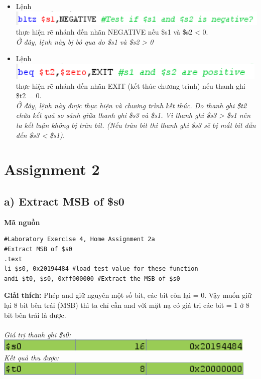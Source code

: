 \documentclass[12pt,a4paper,oneside]{article}
\begin{document}
\begin{itemize}
\begin{center}
\end{center}
\item Lệnh \includegraphics[scale=1]{1.7} thực hiện rẽ nhánh đến nhãn NEGATIVE nếu \$s1 và \$s2 < 0.\\\textit{Ở đây, lệnh này bị bỏ qua do \$s1 và \$s2 > 0}
\item Lệnh \includegraphics[scale=1]{1.8} thực hiện rẽ nhánh đến nhãn EXIT (kết thúc chương trình) nếu thanh ghi \$t2 = 0.\\\textit{Ở đây, lệnh này được thực hiện và chương trình kết thúc. Do thanh ghi \$t2 chứa kết quả so sánh giữa thanh ghi \$s3 và \$s1. Vì thanh ghi \$s3 > \$s1 nên ta kết luận không bị tràn bit. (Nếu tràn bit thì thanh ghi \$s3 sẽ bị mất bit dẫn đến \$s3 < \$s1).}
\end{itemize}



\pagebreak
\section*{Assignment 2}
\subsection*{a) Extract MSB of \$s0}
\textbf{Mã nguồn}
\begin{lstlisting}
#Laboratory Exercise 4, Home Assignment 2a
#Extract MSB of $s0
.text
li $s0, 0x20194484 #load test value for these function
andi $t0, $s0, 0xff000000 #Extract the MSB of $s0
\end{lstlisting}
\textbf{Giải thích:} Phép and giữ nguyên một số bit, các bit còn lại = 0. Vậy muốn giữ lại 8 bit bên trái (MSB) thì ta chỉ cần and với mặt nạ có giá trị các bit = 1 ở 8 bit bên trái là được. \\\\
\textit{Giá trị thanh ghi \$s0: \quad \includegraphics[scale=1]{2.0}}\\
\textit{Kết quả thu được: \quad \quad \includegraphics[scale=1]{2.1}}
\end{document}
